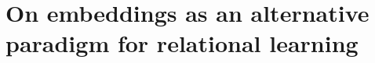 %
%
%
%
%
%
%
%
%







\section{On embeddings as an alternative paradigm for relational learning}



